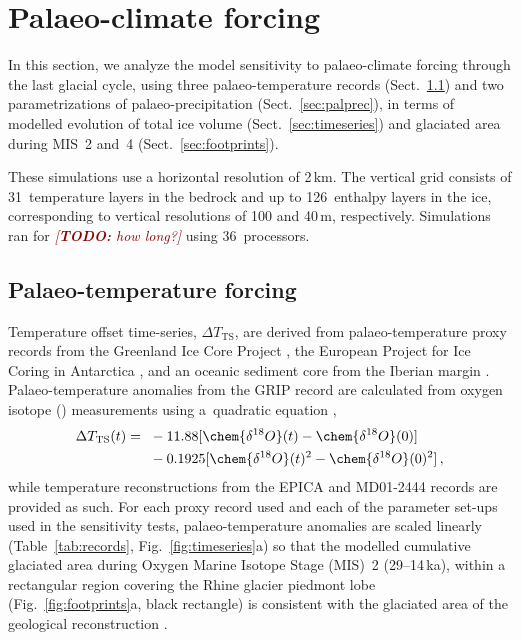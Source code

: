 \documentclass[tc, manuscript]{copernicus}
\newcommand{\todo}[1]{\textcolor{darkred}{\emph{[\textbf{TODO:} #1]}}}
\begin{document}
\section{Palaeo-climate forcing}
\label{sec:climate}

    In this section, we analyze the model sensitivity to palaeo-climate forcing
    through the last glacial cycle, using three palaeo-temperature records
    (Sect.~\ref{sec:paltemp}) and two parametrizations of palaeo-precipitation
    (Sect.~\ref{sec:palprec}), in terms of modelled evolution of total ice
    volume (Sect.~\ref{sec:timeseries}) and glaciated area during MIS~2 and~4
    (Sect.~\ref{sec:footprints}).

    These simulations use a horizontal resolution of 2\,km. The vertical grid
    consists of 31~temperature layers in the bedrock and up to 126~enthalpy
    layers in the ice, corresponding to vertical resolutions of 100 and
    40\,\unit{m}, respectively. Simulations ran for \todo{how long?}
    using 36~processors.


\subsection{Palaeo-temperature forcing}
\label{sec:paltemp}

    Temperature offset time-series, ${\Delta}T_{\text{TS}}$, are derived from
    palaeo-temperature proxy records from the Greenland Ice Core Project
    \citep[GRIP;][]{Dansgaard.etal.1993}, the European Project for Ice Coring
    in Antarctica \citep[EPICA;][] {Jouzel.etal.2007}, and an oceanic sediment
    core from the Iberian margin \citep[MD01-2444;][]{Martrat.etal.2007}.
    Palaeo-temperature anomalies from the GRIP record are calculated from
    oxygen isotope () measurements using a~quadratic
    equation \citep{Johnsen.etal.1995},
    \begin{align}
      {\Delta}T_{\text{TS}}(t) ={~}&-11.88 [\chem{\delta^{18}O}(t)
                                    -\chem{\delta^{18}O}(0)] \nonumber \\
                                   &-0.1925 [\chem{\delta^{18}O}(t)^2
                                    -\chem{\delta^{18}O}(0)^2] \,,
    \end{align}
    while temperature reconstructions from the EPICA and MD01-2444 records are
    provided as such. For each proxy record used and each of the parameter
    set-ups used in the sensitivity tests, palaeo-temperature anomalies are
    scaled linearly (Table~\ref{tab:records}, Fig.~\ref{fig:timeseries}a) so
    that the modelled cumulative glaciated area during Oxygen Marine Isotope
    Stage (MIS)~2 (29--14\,ka), within a rectangular region covering the Rhine
    glacier piedmont lobe (Fig.~\ref{fig:footprints}a, black rectangle) is
    consistent with the glaciated area of the geological reconstruction
    \citep{Ehlers.etal.2011}.
\end{document}
